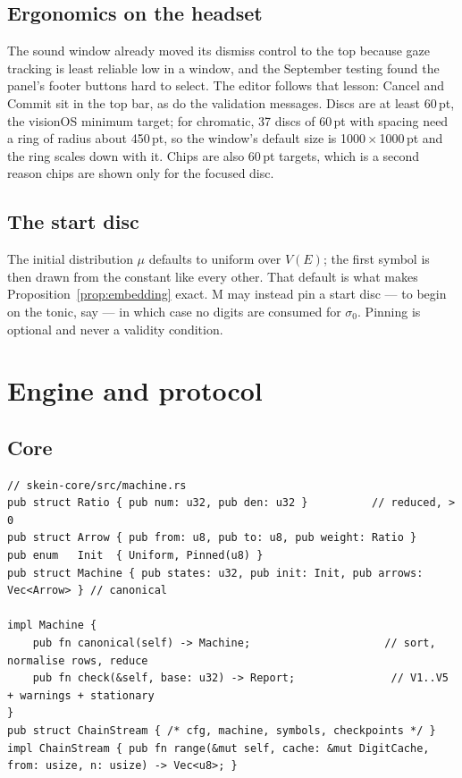 \documentclass[11pt,a4paper]{article}
\theoremstyle{definition}
\theoremstyle{plain}
\theoremstyle{remark}
\begin{document}
\subsection{Ergonomics on the headset}

The sound window already moved its dismiss control to the top because gaze tracking is least
reliable low in a window, and the September testing found the panel's footer buttons hard to
select. The editor follows that lesson: Cancel and Commit sit in the top bar, as do the validation
messages. Discs are at least 60\,pt, the visionOS minimum target; for chromatic, 37 discs of 60\,pt
with spacing need a ring of radius about 450\,pt, so the window's default size is 1000\,$\times$\,1000\,pt
and the ring scales down with it. Chips are also 60\,pt targets, which is a second reason chips are
shown only for the focused disc.

\subsection{The start disc}
\label{sec:start}

The initial distribution $\mu$ defaults to uniform over $V(E)$; the first symbol is then drawn from
the constant like every other. That default is what makes Proposition~\ref{prop:embedding} exact.
M may instead pin a start disc --- to begin on the tonic, say --- in which case no digits are consumed
for $\sigma_0$. Pinning is optional and never a validity condition.

\section{Engine and protocol}
\label{sec:protocol}

\subsection{Core}

\begin{lstlisting}
// skein-core/src/machine.rs
pub struct Ratio { pub num: u32, pub den: u32 }          // reduced, > 0
pub struct Arrow { pub from: u8, pub to: u8, pub weight: Ratio }
pub enum   Init  { Uniform, Pinned(u8) }
pub struct Machine { pub states: u32, pub init: Init, pub arrows: Vec<Arrow> } // canonical

impl Machine {
    pub fn canonical(self) -> Machine;                     // sort, normalise rows, reduce
    pub fn check(&self, base: u32) -> Report;               // V1..V5 + warnings + stationary
}
pub struct ChainStream { /* cfg, machine, symbols, checkpoints */ }
impl ChainStream { pub fn range(&mut self, cache: &mut DigitCache, from: usize, n: usize) -> Vec<u8>; }
\end{lstlisting}
\end{document}
